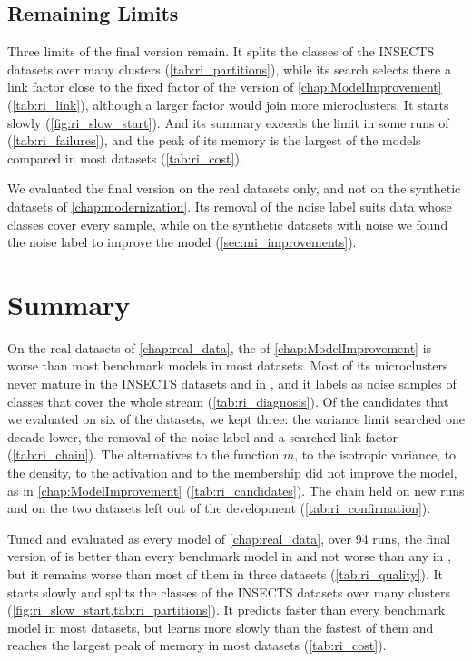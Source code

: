 \subsection{Remaining Limits}
\label{subsec:ri_limits}

Three limits of the final version remain. It splits the classes of the INSECTS datasets over many clusters (\cref{tab:ri_partitions}), while its search selects there a link factor close to the fixed factor of the version of \cref{chap:ModelImprovement} (\cref{tab:ri_link}), although a larger factor would join more microclusters. It starts slowly (\cref{fig:ri_slow_start}). And its summary exceeds the limit in some runs of \Covertype (\cref{tab:ri_failures}), and the peak of its memory is the largest of the models compared in most datasets (\cref{tab:ri_cost}).

We evaluated the final version on the real datasets only, and not on the synthetic datasets of \cref{chap:modernization}. Its removal of the noise label suits data whose classes cover every sample, while on the synthetic datasets with noise we found the noise label to improve the model (\cref{sec:mi_improvements}).

\section{Summary}
\label{sec:ri_summary}

On the real datasets of \cref{chap:real_data}, the \MicroTEDAClusPlus of \cref{chap:ModelImprovement} is worse than most benchmark models in most datasets. Most of its microclusters never mature in the INSECTS datasets and in \Pendigits, and it labels as noise samples of classes that cover the whole stream (\cref{tab:ri_diagnosis}). Of the candidates that we evaluated on six of the datasets, we kept three: the variance limit searched one decade lower, the removal of the noise label and a searched link factor (\cref{tab:ri_chain}). The alternatives to the function $m$, to the isotropic variance, to the density, to the activation and to the membership did not improve the model, as in \cref{chap:ModelImprovement} (\cref{tab:ri_candidates}). The chain held on new runs and on the two datasets left out of the development (\cref{tab:ri_confirmation}).

Tuned and evaluated as every model of \cref{chap:real_data}, over 94 runs, the final version of \MicroTEDAClusPlus is better than every benchmark model in \Shuttle and not worse than any in \Pendigits, but it remains worse than most of them in three datasets (\cref{tab:ri_quality}). It starts slowly and splits the classes of the INSECTS datasets over many clusters (\cref{fig:ri_slow_start,tab:ri_partitions}). It predicts faster than every benchmark model in most datasets, but learns more slowly than the fastest of them and reaches the largest peak of memory in most datasets (\cref{tab:ri_cost}).
